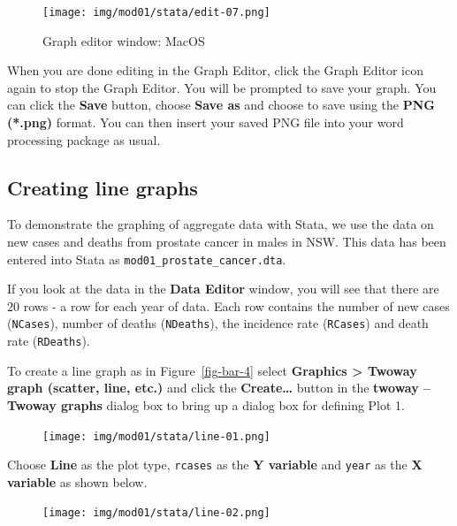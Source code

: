 \documentclass[
  a4paper,
]{memoir}
\begin{document}
\begin{figure}[H]

{\centering \texttt{[image: img/mod01/stata/edit-07.png]}

}

\caption{Graph editor window: MacOS}

\end{figure}

When you are done editing in the Graph Editor, click the Graph Editor
icon again to stop the Graph Editor. You will be prompted to save your
graph. You can click the \textbf{Save} button, choose \textbf{Save as}
and choose to save using the \textbf{PNG (*.png)} format. You can then
insert your saved PNG file into your word processing package as usual.

\hypertarget{creating-line-graphs}{%
\subsection{Creating line graphs}\label{creating-line-graphs}}

To demonstrate the graphing of aggregate data with Stata, we use the
data on new cases and deaths from prostate cancer in males in NSW. This
data has been entered into Stata as
\texttt{mod01\_prostate\_cancer.dta}.

If you look at the data in the \textbf{Data Editor} window, you will see
that there are 20 rows - a row for each year of data. Each row contains
the number of new cases (\texttt{NCases}), number of deaths
(\texttt{NDeaths}), the incidence rate (\texttt{RCases}) and death rate
(\texttt{RDeaths}).

To create a line graph as in Figure~\ref{fig-bar-4} select
\textbf{Graphics \textgreater{} Twoway graph (scatter, line, etc.)} and
click the \textbf{Create\ldots{}} button in the \textbf{twoway -- Twoway
graphs} dialog box to bring up a dialog box for defining Plot 1.

\begin{figure}[H]

{\centering \texttt{[image: img/mod01/stata/line-01.png]}

}

\end{figure}

Choose \textbf{Line} as the plot type, \texttt{rcases} as the \textbf{Y
variable} and \texttt{year} as the \textbf{X variable} as shown below.

\begin{figure}[H]

{\centering \texttt{[image: img/mod01/stata/line-02.png]}

}

\end{figure}
\end{document}
